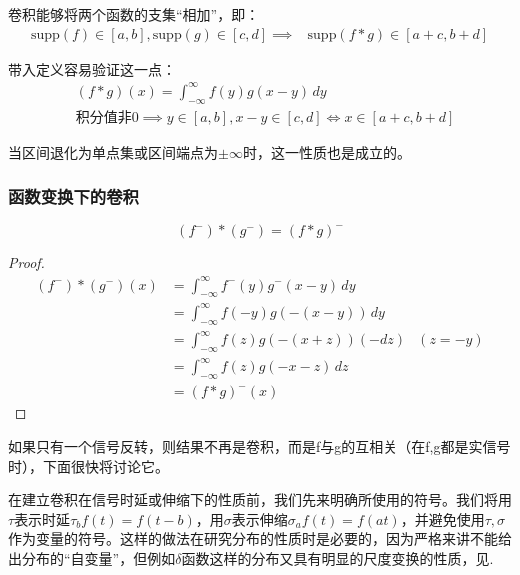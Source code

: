 \begin{proposition}
    \label{prop:conv_supp}
    卷积能够将两个函数的支集“相加”，即：\begin{align*}
        \mathrm{supp}(f)\in [a,b],\mathrm{supp}(g)\in [c,d]\implies & \mathrm{supp}(f*g)\in [a+c,b+d]
    \end{align*}
\end{proposition}

带入定义容易验证这一点：
\begin{align*}
     & (f*g)(x) =\int_{-\infty}^{\infty}f(y)g(x-y)\,dy                 \\
     & \text{积分值非0}\implies y\in [a,b],x-y\in [c,d]\iff x\in [a+c,b+d]
\end{align*}

当区间退化为单点集或区间端点为$\pm\infty$时，这一性质也是成立的。

\subsubsection{函数变换下的卷积}
\begin{proposition}[信号反转下的卷积]
    \[(f^-)*(g^-)=(f*g)^-\]
\end{proposition}
\begin{proof}
    \begin{align*}
        (f^-)*(g^-)(x) & =\int_{-\infty}^{\infty}f^-(y)g^-(x-y)\,dy          \\
                       & =\int_{-\infty}^{\infty}f(-y)g(-(x-y))\,dy          \\
                       & =\int_{-\infty}^{\infty}f(z)g(-(x+z))(-dz) & (z=-y) \\
                       & =\int_{-\infty}^{\infty}f(z)g(-x-z)\,dz             \\
                       & =(f*g)^-(x)
    \end{align*}
\end{proof}

如果只有一个信号反转，则结果不再是卷积，而是f与g的互相关（在f,g都是实信号时），下面很快将讨论它。

在建立卷积在信号时延或伸缩下的性质前，我们先来明确所使用的符号。我们将用$\tau$表示时延$\tau_b f(t)=f(t-b)$，用$\sigma$表示伸缩$\sigma_a f(t)=f(at)$，并避免使用$\tau,\sigma$作为变量的符号。这样的做法在研究分布的性质时是必要的，因为严格来讲不能给出分布的“自变量”，但例如$\delta$函数这样的分布又具有明显的尺度变换的性质，见.

